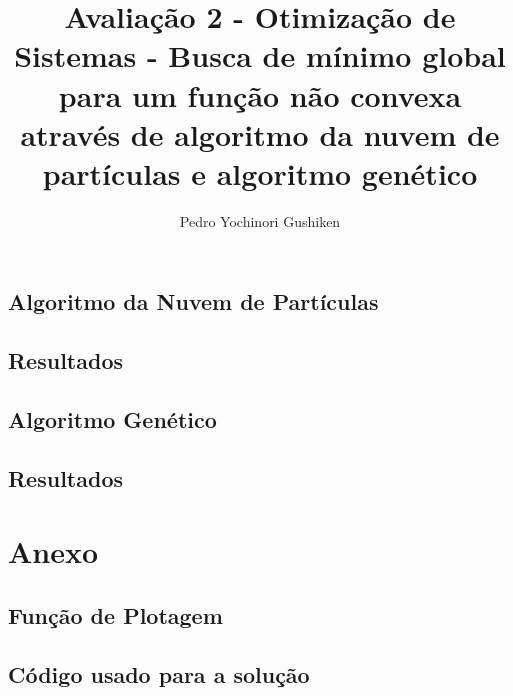 \documentclass[11pt]{report}
\title{Avaliação 2 - Otimização de Sistemas - Busca de mínimo global para um função não convexa através de algoritmo da nuvem de partículas e algoritmo genético}
\author{Pedro Yochinori Gushiken}
\begin{document}
\maketitle
\section*{Algoritmo da Nuvem de Partículas}

\section*{Resultados}

\section*{Algoritmo Genético}

\section*{Resultados}

\chapter*{Anexo}
\section*{Função de Plotagem}

\section*{Código usado para a solução}

\end{document}

